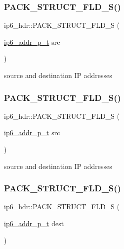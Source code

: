 \subsubsection{\texorpdfstring{P\+A\+C\+K\+\_\+\+S\+T\+R\+U\+C\+T\+\_\+\+F\+L\+D\+\_\+\+S()}{PACK\_STRUCT\_FLD\_S()}\hspace{0.1cm}{\footnotesize\ttfamily [1/4]}}
{\footnotesize\ttfamily ip6\+\_\+hdr\+::\+P\+A\+C\+K\+\_\+\+S\+T\+R\+U\+C\+T\+\_\+\+F\+L\+D\+\_\+S (\begin{DoxyParamCaption}\item[{\hyperlink{native_2lwip_2src_2include_2lwip_2prot_2ip6_8h_a560932a657f17ec5a0a3a78a1ce7e60a}{ip6\+\_\+addr\+\_\+p\+\_\+t}}]{src }\end{DoxyParamCaption})}

source and destination IP addresses \mbox{\label{structip6__hdr_a5a575c55ef0ba5454a4b2930cfc10733}} 
\subsubsection{\texorpdfstring{P\+A\+C\+K\+\_\+\+S\+T\+R\+U\+C\+T\+\_\+\+F\+L\+D\+\_\+\+S()}{PACK\_STRUCT\_FLD\_S()}\hspace{0.1cm}{\footnotesize\ttfamily [2/4]}}
{\footnotesize\ttfamily ip6\+\_\+hdr\+::\+P\+A\+C\+K\+\_\+\+S\+T\+R\+U\+C\+T\+\_\+\+F\+L\+D\+\_\+S (\begin{DoxyParamCaption}\item[{\hyperlink{native_2lwip_2src_2include_2lwip_2prot_2ip6_8h_a560932a657f17ec5a0a3a78a1ce7e60a}{ip6\+\_\+addr\+\_\+p\+\_\+t}}]{src }\end{DoxyParamCaption})}

source and destination IP addresses \mbox{\label{structip6__hdr_a811301a2309cec8d73a5d79fb5d45578}} 
\subsubsection{\texorpdfstring{P\+A\+C\+K\+\_\+\+S\+T\+R\+U\+C\+T\+\_\+\+F\+L\+D\+\_\+\+S()}{PACK\_STRUCT\_FLD\_S()}\hspace{0.1cm}{\footnotesize\ttfamily [3/4]}}
{\footnotesize\ttfamily ip6\+\_\+hdr\+::\+P\+A\+C\+K\+\_\+\+S\+T\+R\+U\+C\+T\+\_\+\+F\+L\+D\+\_\+S (\begin{DoxyParamCaption}\item[{\hyperlink{native_2lwip_2src_2include_2lwip_2prot_2ip6_8h_a560932a657f17ec5a0a3a78a1ce7e60a}{ip6\+\_\+addr\+\_\+p\+\_\+t}}]{dest }\end{DoxyParamCaption})}

